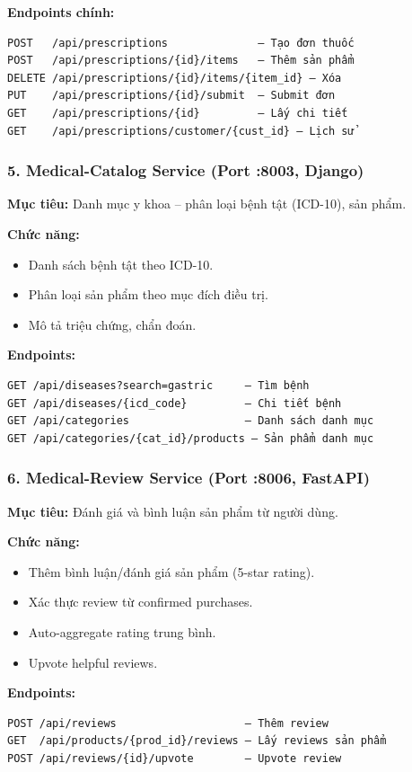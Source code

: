 \documentclass[12pt,a4paper]{article}
\begin{document}
\textbf{Endpoints chính:}
\begin{verbatim}
POST   /api/prescriptions              – Tạo đơn thuốc
POST   /api/prescriptions/{id}/items   – Thêm sản phẩm
DELETE /api/prescriptions/{id}/items/{item_id} – Xóa
PUT    /api/prescriptions/{id}/submit  – Submit đơn
GET    /api/prescriptions/{id}         – Lấy chi tiết
GET    /api/prescriptions/customer/{cust_id} – Lịch sử
\end{verbatim}

\subsubsection{5. Medical-Catalog Service (Port :8003, Django)}

\textbf{Mục tiêu:} Danh mục y khoa – phân loại bệnh tật (ICD-10), sản phẩm.

\textbf{Chức năng:}
\begin{itemize}
    \item Danh sách bệnh tật theo ICD-10.
    \item Phân loại sản phẩm theo mục đích điều trị.
    \item Mô tả triệu chứng, chẩn đoán.
\end{itemize}

\textbf{Endpoints:}
\begin{verbatim}
GET /api/diseases?search=gastric     – Tìm bệnh
GET /api/diseases/{icd_code}         – Chi tiết bệnh
GET /api/categories                  – Danh sách danh mục
GET /api/categories/{cat_id}/products – Sản phẩm danh mục
\end{verbatim}

\subsubsection{6. Medical-Review Service (Port :8006, FastAPI)}

\textbf{Mục tiêu:} Đánh giá và bình luận sản phẩm từ người dùng.

\textbf{Chức năng:}
\begin{itemize}
    \item Thêm bình luận/đánh giá sản phẩm (5-star rating).
    \item Xác thực review từ confirmed purchases.
    \item Auto-aggregate rating trung bình.
    \item Upvote helpful reviews.
\end{itemize}

\textbf{Endpoints:}
\begin{verbatim}
POST /api/reviews                    – Thêm review
GET  /api/products/{prod_id}/reviews – Lấy reviews sản phẩm
POST /api/reviews/{id}/upvote        – Upvote review
\end{verbatim}
\end{document}
